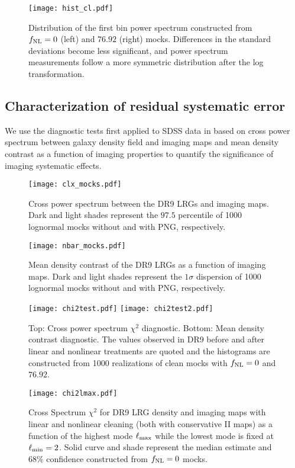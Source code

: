 \begin{figure}
\centering
\texttt{[image: hist\_cl.pdf]}
\caption{Distribution of the first bin power spectrum constructed from $f_{\rm NL}=0$ (left) and $76.92$ (right) mocks. Differences in the standard deviations become less significant, and power spectrum measurements follow a more symmetric distribution after the log transformation.}\label{fig:histcell}
\end{figure}


\subsection{Characterization of residual systematic error}
\label{ssec:characterization}


We use the diagnostic tests first applied to SDSS data in \cite{rezaie2021primordial} based on cross power spectrum between galaxy density field and imaging maps and mean density contrast as a function of imaging properties to quantify the significance of imaging systematic effects. 

\begin{figure*}
\centering
\texttt{[image: clx\_mocks.pdf]}
\caption{Cross power spectrum between the DR9 LRGs and imaging maps. Dark and light shades represent the $97.5$ percentile of 1000 lognormal mocks without and with PNG, respectively.}\label{fig:clxmock}
\end{figure*}

\begin{figure*}
\centering
\texttt{[image: nbar\_mocks.pdf]}
\caption{Mean density contrast of the DR9 LRGs as a function of imaging maps. Dark and light shades represent the $1\sigma$ dispersion of 1000 lognormal mocks without and with PNG, respectively.}\label{fig:nbarmock}
\end{figure*}


\begin{figure}
\centering
\texttt{[image: chi2test.pdf]}
\texttt{[image: chi2test2.pdf]}
\caption{Top: Cross power spectrum $\chi^{2}$ diagnostic. Bottom: Mean density contrast diagnostic. The values observed in DR9 before and after linear and nonlinear treatments are quoted and the histograms are constructed from 1000 realizations of clean mocks with $f_{\rm NL}=0$ and $76.92$.}\label{fig:chi2test}
\end{figure}

\begin{figure}
\centering
\texttt{[image: chi2lmax.pdf]}
\caption{Cross Spectrum $\chi^{2}$ for DR9 LRG density and imaging maps with linear and nonlinear cleaning (both with conservative II maps) as a function of the highest mode $\ell_{\rm max}$ while the lowest mode is fixed at $\ell_{\rm min}=2$. Solid curve and shade represent the median estimate and $68\%$ confidence constructed from $f_{\rm NL}=0$ mocks.}\label{fig:chi2cellextend}
\end{figure}


